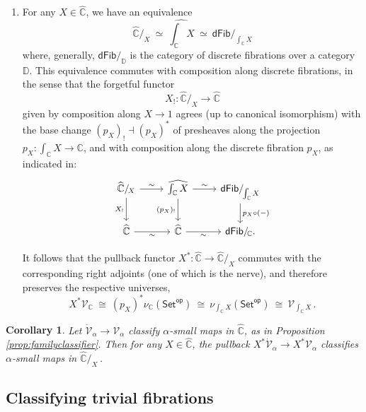 \documentclass[11pt,reqno]{amsart}
\newcommand{\bbC}{\ensuremath{\mathbb{C}}}
\newcommand{\Set}{\ensuremath{\mathsf{Set}}}
\newcommand{\slice}[1]{\ensuremath{/_{\!{#1}}}}
\renewcommand{\to}{\ensuremath{\rightarrow}}
\newcommand{\V}{\ensuremath{\mathcal{V}}}
\newcommand{\VV}{\ensuremath{\dot{\mathcal{V}}}}
\newtheorem{corollary}[theorem]{Corollary}
\theoremstyle{remark}
\theoremstyle{definition}
\begin{document}
\begin{enumerate}
\item For any $X\in \widehat{\bbC}$, we have an equivalence 
\[
\widehat{\bbC}\slice{X}\ %
\simeq\ \widehat{\textstyle \int_{\bbC}X}\ \simeq\ \mathsf{dFib}/_{\!\int_{\bbC}X}
\]
where, generally, $\mathsf{dFib}/_{\mathbb{D}}$ is the category of discrete fibrations over a category $\mathbb{D}$.
This equivalence commutes with composition along discrete fibrations, in the sense that the forgetful functor 
\[
{X_!}: \widehat{\bbC}\slice{X} \to \widehat{\bbC}
\]
 given by composition along $X \to 1$ agrees (up to canonical isomorphism) with the base change $(p_X)_! \dashv (p_X)^*$ of presheaves along the projection  ${\textstyle  p_X : \int_{\bbC}X \to  \bbC}$, and with composition along the discrete fibration $p_X$, as indicated in:
\begin{equation}\label{diagram:sliceuniversepullsback}
\begin{tikzcd}
\widehat{\bbC}\slice{X}  \ar[d,swap,"{{X_!}}"] \ar[r, "{\sim}"] 
	& \widehat{\textstyle \int_{\bbC}X} \ar[d,swap,"{{(p_X)_!}}"] \ar[r, "{\sim}"] 
		& \mathsf{dFib}/_{\!\int_{\bbC}X} \ar[d,"p_X\circ(-)"]  \\
 \widehat{\bbC}  \ar[r,swap, "{\sim}"]   & \widehat{\bbC}  \ar[r,swap, "{\sim}"] 
	&  \mathsf{dFib}/_{\!\bbC}.
\end{tikzcd}
\end{equation}

It follows that the pullback functor $X^* : \widehat{\bbC} \to \widehat{\bbC}\slice{X}$ commutes with the corresponding right adjoints (one of which is the nerve), and therefore preserves the respective universes, 
\[\textstyle
 X^* \V_{\bbC} \ 
   \cong\ (p_X)^* \nu_{\bbC}(\Set^{\mathsf{op}}) \ 
   \cong\  \nu_{\int_{\bbC}X}(\Set^{\mathsf{op}}) \ 
   \cong\  \V_{ \int_{\bbC}X} \,.
 \]
\end{enumerate}

 \begin{corollary}\label{prop:familyclassifierforslices}
Let $\VV_\alpha\to\V_\alpha$ classify $\alpha$-small maps in $\widehat{\bbC}$, as in Proposition \ref{prop:familyclassifier}.  Then for any $X\in \widehat{\bbC}$, the pullback $X^*\VV_\alpha\to X^*\V_\alpha$ classifies 
$\alpha$-small maps in $\widehat{\bbC}\slice{X}$\,.
\end{corollary}

\subsection*{Classifying trivial fibrations}
\end{document}
